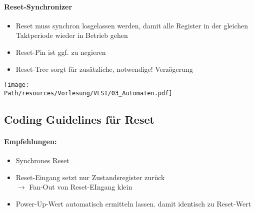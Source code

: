 	\paragraph{Reset-Synchronizer}
	\begin{itemize}
		\item Reset muss synchron losgelassen werden, damit alle Register in der gleichen Taktperiode wieder in Betrieb gehen
		\item Reset-Pin ist ggf. zu negieren
		\item Reset-Tree sorgt für zusätzliche, notwendige! Verzögerung
	\end{itemize}
	\begin{center}
		\texttt{[image: \\Path/resources/Vorlesung/VLSI/03\_Automaten.pdf]}
	\end{center}
	
\subsection{Coding Guidelines für Reset}
	\paragraph{Empfehlungen:}
	\begin{itemize}
		\item Synchrones Reset
		\item Reset-Eingang setzt nur Zustandsregister zurück\\
			$\to$ Fan-Out von Reset-EIngang klein
		\item Power-Up-Wert automatisch ermitteln lassen. damit identisch zu Reset-Wert
	\end{itemize}
